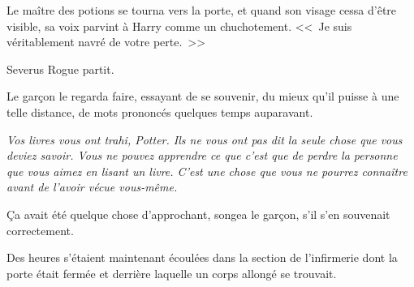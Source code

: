 Le maître des potions se tourna vers la porte, et quand son visage cessa d'être visible, sa voix parvint à Harry comme un chuchotement. <<~Je suis véritablement navré de votre perte.~>>

Severus Rogue partit.

Le garçon le regarda faire, essayant de se souvenir, du mieux qu'il puisse à une telle distance, de mots prononcés quelques temps auparavant.

\emph{Vos livres vous ont trahi, Potter. Ils ne vous ont pas dit la seule chose que vous deviez savoir. Vous ne pouvez apprendre ce que c'est que de perdre la personne que vous aimez en lisant un livre. C'est une chose que vous ne pourrez connaître avant de l'avoir vécue vous-même.}

Ça avait été quelque chose d'approchant, songea le garçon, s'il s'en souvenait correctement.

\later

Des heures s'étaient maintenant écoulées dans la section de l'infirmerie dont la porte était fermée et derrière laquelle un corps allongé se trouvait.

